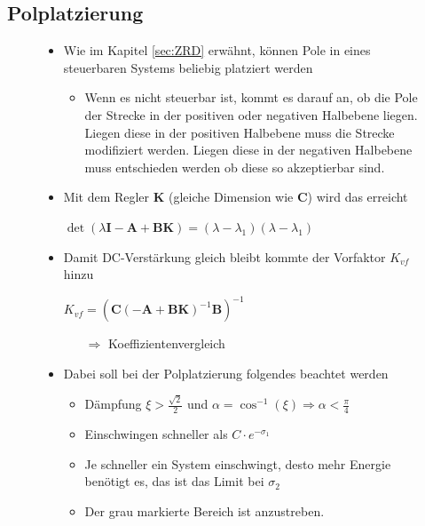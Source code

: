 \subsection{Polplatzierung}
\label{subsec:Polplatzierung}
\begin{figure}[!h]
	\begin{minipage}{.7\linewidth}
	\begin{itemize}
		\small
		\item Wie im Kapitel \ref{sec:ZRD} erwähnt, können Pole in eines steuerbaren Systems beliebig platziert werden
		\begin{itemize}
			\item Wenn es nicht steuerbar ist, kommt es darauf an, ob die Pole der Strecke in der positiven oder negativen Halbebene liegen. Liegen diese in der positiven Halbebene muss die Strecke modifiziert werden. Liegen diese in der negativen Halbebene muss entschieden werden ob diese so akzeptierbar sind. 
		\end{itemize}
		\item Mit dem Regler $\boldsymbol{K}$ (gleiche Dimension wie $\boldsymbol{C}$) wird das erreicht
		\item[ ] $\det\left( \lambda\boldsymbol{I}-\boldsymbol{A}+\boldsymbol{BK}\right) 
		= \left(\lambda - \lambda_1\right) \left(\lambda-\lambda_1\right)$
		\item Damit DC-Verstärkung gleich bleibt kommte der Vorfaktor $K_{vf}$ hinzu
		\item[ ] $K_{vf}=\left( \boldsymbol{C}\left( -\boldsymbol{A}+\boldsymbol{BK}\right)^{-1} \boldsymbol{B}\right)^{-1}$
		\begin{itemize}
			\item [$\Rightarrow$] Koeffizientenvergleich
		\end{itemize}
		\item Dabei soll bei der Polplatzierung folgendes beachtet werden
		\begin{itemize}
			\item Dämpfung $\xi>\frac{\sqrt{2}}{2}$ und $ \alpha = \cos^{-1}\left(\xi\right)\Rightarrow \alpha < \frac{\pi}{4}$
			\item Einschwingen schneller als $C\cdot e^{-\sigma_1}$
			\item Je schneller ein System einschwingt, desto mehr Energie benötigt es, das ist das Limit bei $\sigma_2$
			\item Der grau markierte Bereich ist anzustreben. 
		\end{itemize}
	\end{itemize}

\end{minipage}
\end{figure}
